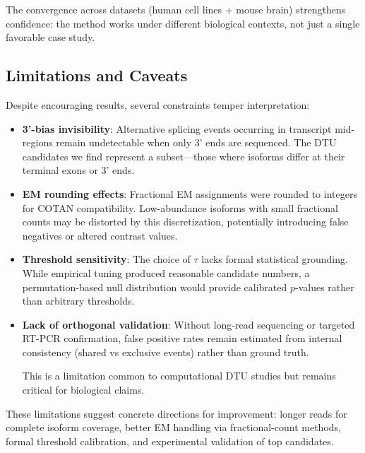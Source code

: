 The convergence across datasets (human cell lines + mouse brain) strengthens confidence: the method works under different biological contexts, not just a single favorable case study.

\subsection*{Limitations and Caveats}

Despite encouraging results, several constraints temper interpretation:
\begin{itemize}
    \item \textbf{3'-bias invisibility}: Alternative splicing events occurring in transcript mid-regions remain undetectable when only 3' ends are sequenced. The DTU candidates we find represent a subset---those where isoforms differ at their terminal exons or 3' ends.

    \item \textbf{EM rounding effects}: Fractional EM assignments were rounded to integers for COTAN compatibility. Low-abundance isoforms with small fractional counts may be distorted by this discretization, potentially introducing false negatives or altered contrast values.

    \item \textbf{Threshold sensitivity}: The choice of $\tau$ lacks formal statistical grounding. While empirical tuning produced reasonable candidate numbers, a permutation-based null distribution would provide calibrated $p$-values rather than arbitrary thresholds.

    \item \textbf{Lack of orthogonal validation}: Without long-read sequencing or targeted RT-PCR confirmation, false positive rates remain estimated from internal consistency (shared vs exclusive events) rather than ground truth.

This is a limitation common to computational DTU studies but remains critical for biological claims.
\end{itemize}

These limitations suggest concrete directions for improvement: longer reads for complete isoform coverage, better EM handling via fractional-count methods, formal threshold calibration, and experimental validation of top candidates.

